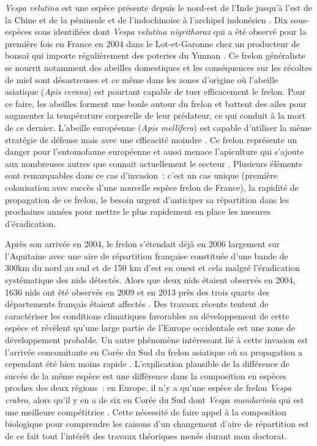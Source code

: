 \emph{Vespa velutina} est une espèce présente depuis le nord-est de
l'Inde jusqu'à l'est de la Chine et de la péninsule et de l'indochinoise
à l'archipel indonésien \citep{Villemant2006}. Dix sous-espèces sous
identifiées dont \emph{Vespa velutina nigrithorax} qui a été observé
pour la première fois en France en 2004 dans le Lot-et-Garonne chez un
producteur de bonsaï qui importe régulièrement des poteries du Yunnan
\citep{Villemant2006}. Ce frelon généraliste se nourrit notamment des
abeilles domestiques et les conséquences sur les récoltes de miel sont
désastreuses et ce même dans les zones d'origine où l'abeille asiatique
(\emph{Apis cerana}) est pourtant capable de tuer efficacement le
frelon. Pour ce faire, les abeilles forment une boule autour du frelon
et battent des ailes pour augmenter la température corporelle de leur
prédateur, ce qui conduit à la mort de ce dernier. L'abeille européenne
(\emph{Apis mellifera}) est capable d'utiliser la même stratégie de
défense mais avec une efficacité moindre \citep{Villemant2006}. Ce
frelon représente un danger pour l'entomofaune européenne et aussi
menace l'apiculture qui s'ajoute aux nombreuses autres que connait
actuellement le secteur \citep{Vanbergen2013}. Plusieurs éléments sont
remarquables dans ce cas d'invasion~: c'est un cas unique (première
colonisation avec succès d'une nouvelle espèce frelon de France), la
rapidité de propagation de ce frelon, le besoin urgent d'anticiper sa
répartition dans les prochaines années pour mettre le plus rapidement en
place les mesures d'éradication.

Après son arrivée en 2004, le frelon s'étendait déjà en 2006 largement
sur l'Aquitaine avec une aire de répartition française constituée d'une
bande de 300km du nord au sud et de 150 km d'est en ouest
\citep{Villemant2006} et cela malgré l'éradication systématique des nids
détectés. Alors que deux nids étaient observés en 2004, 1636 nids ont
été observés en 2009 et en 2013 près des trois quarts des départements
français étaient affectés \citep{Robinet2016}. Des travaux récents
tentent de caractériser les conditions climatiques favorables au
développement de cette espèce \citep{Villemant2011} et révèlent qu'une
large partie de l'Europe occidentale est une zone de développement
probable. Un autre phénomène intéressant lié à cette invasion est
l'arrivée concomitante en Corée du Sud du frelon asiatique où sa
propagation a cependant été bien moins rapide \citep{Villemant2011}.
L'explication plausible de la différence de succès de la même espèce est
une différence dans la composition en espèces proches des deux régions~:
en Europe, il n'y a qu'une espèce de frelon \emph{Vespa crabro}, alors
qu'il y en a de six en Corée du Sud dont \emph{Vespa mandarinia} qui est
une meilleure compétitrice \citep{Villemant2011}. Cette nécessité de
faire appel à la composition biologique pour comprendre les raisons d'un
changement d'aire de répartition est de ce fait tout l'intérêt des
travaux théoriques menés durant mon doctorat.

